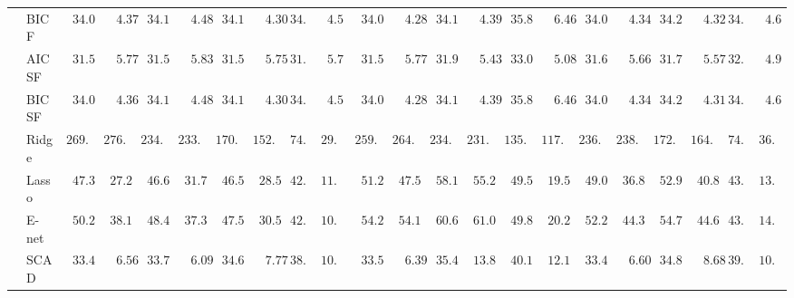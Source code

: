 \documentclass{article}
\begin{document}
\begin{tabular}{ll|ll|llllll|llllll|llllll}
 & BIC F  & $\phantom{0}34.02$ & $\phantom{00}4.37$ & $\phantom{0}34.12$ & $\phantom{00}4.48$ & $\phantom{0}34.14$ & $\phantom{00}4.30$ & $34.37$ & $\phantom{0}4.51$ & $\phantom{0}34.07$ & $\phantom{00}4.28$ & $\phantom{0}34.15$ & $\phantom{00}4.39$ & $\phantom{0}35.82$ & $\phantom{00}6.46$ & $\phantom{0}34.05$ & $\phantom{00}4.34$ & $\phantom{0}34.24$ & $\phantom{00}4.32$ & $34.79$ & $\phantom{0}4.62$ \\
 & AIC SF  & $\phantom{0}31.51$ & $\phantom{00}5.77$ & $\phantom{0}31.53$ & $\phantom{00}5.83$ & $\phantom{0}31.56$ & $\phantom{00}5.75$ & $31.61$ & $\phantom{0}5.72$ & $\phantom{0}31.55$ & $\phantom{00}5.77$ & $\phantom{0}31.90$ & $\phantom{00}5.43$ & $\phantom{0}33.01$ & $\phantom{00}5.08$ & $\phantom{0}31.64$ & $\phantom{00}5.66$ & $\phantom{0}31.77$ & $\phantom{00}5.57$ & $32.85$ & $\phantom{0}4.91$ \\
 & BIC SF  & $\phantom{0}34.03$ & $\phantom{00}4.36$ & $\phantom{0}34.12$ & $\phantom{00}4.48$ & $\phantom{0}34.14$ & $\phantom{00}4.30$ & $34.37$ & $\phantom{0}4.51$ & $\phantom{0}34.07$ & $\phantom{00}4.28$ & $\phantom{0}34.15$ & $\phantom{00}4.39$ & $\phantom{0}35.83$ & $\phantom{00}6.46$ & $\phantom{0}34.05$ & $\phantom{00}4.34$ & $\phantom{0}34.25$ & $\phantom{00}4.31$ & $34.79$ & $\phantom{0}4.62$ \\
 & Ridge  & $269.44$ & $276.63$ & $234.70$ & $233.99$ & $170.94$ & $152.09$ & $74.95$ & $29.61$ & $259.86$ & $264.07$ & $234.15$ & $231.49$ & $135.20$ & $117.41$ & $236.35$ & $238.97$ & $172.96$ & $164.54$ & $74.94$ & $36.67$ \\
 & Lasso  & $\phantom{0}47.33$ & $\phantom{0}27.24$ & $\phantom{0}46.60$ & $\phantom{0}31.77$ & $\phantom{0}46.53$ & $\phantom{0}28.52$ & $42.51$ & $11.27$ & $\phantom{0}51.29$ & $\phantom{0}47.56$ & $\phantom{0}58.19$ & $\phantom{0}55.20$ & $\phantom{0}49.53$ & $\phantom{0}19.51$ & $\phantom{0}49.00$ & $\phantom{0}36.86$ & $\phantom{0}52.96$ & $\phantom{0}40.85$ & $43.80$ & $13.81$ \\
 & E-net  & $\phantom{0}50.24$ & $\phantom{0}38.13$ & $\phantom{0}48.44$ & $\phantom{0}37.33$ & $\phantom{0}47.58$ & $\phantom{0}30.58$ & $42.45$ & $10.90$ & $\phantom{0}54.22$ & $\phantom{0}54.16$ & $\phantom{0}60.64$ & $\phantom{0}61.06$ & $\phantom{0}49.82$ & $\phantom{0}20.28$ & $\phantom{0}52.28$ & $\phantom{0}44.36$ & $\phantom{0}54.71$ & $\phantom{0}44.63$ & $43.98$ & $14.06$ \\
 & SCAD  & $\phantom{0}33.40$ & $\phantom{00}6.56$ & $\phantom{0}33.70$ & $\phantom{00}6.09$ & $\phantom{0}34.69$ & $\phantom{00}7.77$ & $38.66$ & $10.23$ & $\phantom{0}33.50$ & $\phantom{00}6.39$ & $\phantom{0}35.48$ & $\phantom{0}13.81$ & $\phantom{0}40.10$ & $\phantom{0}12.19$ & $\phantom{0}33.49$ & $\phantom{00}6.60$ & $\phantom{0}34.81$ & $\phantom{00}8.68$ & $39.06$ & $10.90$ \\

\end{tabular}
\end{document}

